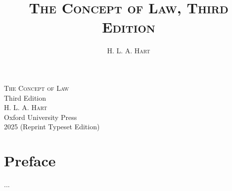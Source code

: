 \documentclass[12pt, oneside]{book}
\title{\textsc{The Concept of Law, Third Edition}}
\author{\textsc{H. L. A. Hart}}
\begin{document}
\begin{titlepage}
  \centering
  \vspace*{3cm}
  {\Huge\textsc{The Concept of Law}}\\[1.5ex]
  {\Large Third Edition}\\[4ex]
  \textsc{H. L. A. Hart}\\[6ex]
  {\small Oxford University Press\\
  2025 (Reprint Typeset Edition)}
  \vfill
\end{titlepage}

\tableofcontents
\cleardoublepage

\chapter*{Preface}
...

\end{document}
